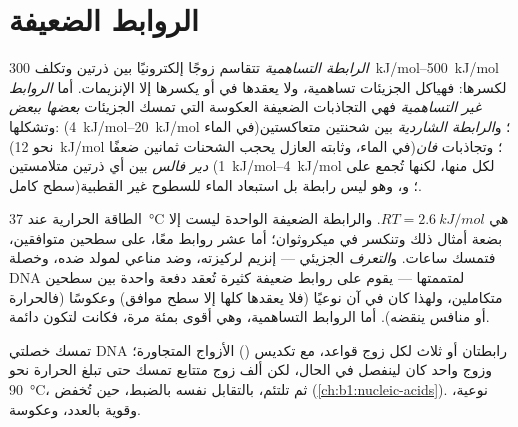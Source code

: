 \section{الروابط الضعيفة}

\begin{definition}\label{def:b1:water-small-molecules:bonds}
\emph{الرابطة التساهمية} تتقاسم زوجًا
إلكترونيًا بين ذرتين وتكلف \qtyrange{300}{500}{kJ/mol} لكسرها: فهياكل
الجزيئات تساهمية، ولا يعقدها في  أو يكسرها إلا الإنزيمات.
أما \emph{الروابط غير التساهمية} فهي
التجاذبات الضعيفة العكوسة التي تمسك الجزيئات \emph{بعضها ببعض} وتشكلها:
\emph{} (\qtyrange{4}{20}{kJ/mol} في الماء)؛
و\emph{الرابطة الشاردية} بين شحنتين متعاكستين
(نحو \qty{12}{kJ/mol} في الماء، وثابته العازل يحجب الشحنات ثمانين
ضعفًا)؛ وتجاذبات \emph{فان دير فالس} بين أي
ذرتين متلامستين (\qtyrange{1}{4}{kJ/mol} لكل منها، لكنها تُجمع على
سطح كامل)؛ و\emph{}، وهو ليس رابطة بل استبعاد
الماء للسطوح غير القطبية.
\end{definition}

\begin{proposition}\label{prop:b1:water-small-molecules:weak}
الطاقة الحرارية عند \qty{37}{\celsius} هي $RT = \qty{2.6}{kJ/mol}$.
والرابطة الضعيفة الواحدة ليست إلا بضعة أمثال ذلك وتنكسر في
ميكروثوان؛ أما عشر روابط معًا، على سطحين متوافقين، فتمسك ساعات.
و\emph{التعرف} الجزيئي --- إنزيم لركيزته، وضد
مناعي لمولد ضده، وخصلة DNA لمتممتها --- يقوم على روابط ضعيفة كثيرة
تُعقد دفعة واحدة بين سطحين متكاملين، ولهذا كان في آن نوعيًا (فلا
يعقدها كلها إلا سطح موافق) وعكوسًا (فالحرارة أو منافس ينقضه). أما
الروابط التساهمية، وهي أقوى بمئة مرة، فكانت لتكون دائمة.
\end{proposition}

\begin{example}\label{ex:b1:water-small-molecules:melting}
تمسك خصلتي DNA رابطتان أو ثلاث  لكل زوج قواعد، مع
تكديس () الأزواج المتجاورة؛ وزوج واحد كان لينفصل في
الحال، لكن ألف زوج متتابع تمسك حتى تبلغ الحرارة نحو
\qty{90}{\celsius}، ثم تلتئم، بالتقابل نفسه بالضبط، حين تُخفض
(\cref{ch:b1:nucleic-acids}). نوعية، وقوية بالعدد، وعكوسة.
\end{example}

